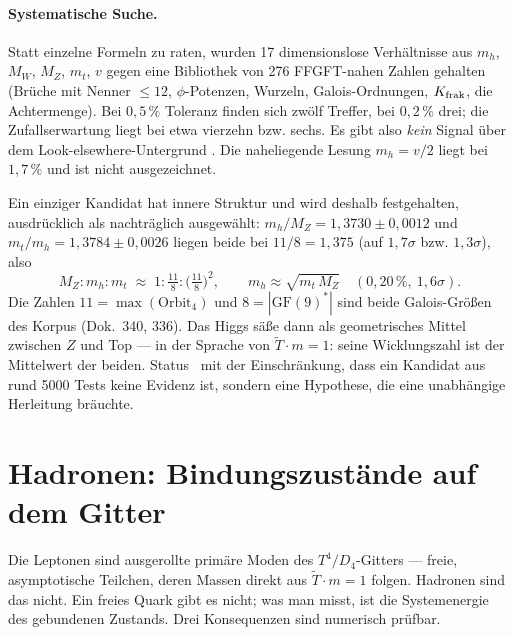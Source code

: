 \paragraph{Systematische Suche.}
Statt einzelne Formeln zu raten, wurden 17 dimensionslose Verhältnisse aus
$m_h$, $M_W$, $M_Z$, $m_t$, $v$ gegen eine Bibliothek von 276 FFGFT-nahen
Zahlen gehalten (Brüche mit Nenner $\le 12$, $\phi$-Potenzen, Wurzeln,
Galois-Ordnungen, $K_{\rm frak}$, die Achtermenge). Bei $0{,}5\,\%$
Toleranz finden sich zwölf Treffer, bei $0{,}2\,\%$ drei; die
Zufallserwartung liegt bei etwa vierzehn bzw. sechs. Es gibt also
\emph{kein} Signal über dem Look-elsewhere-Untergrund \XM. Die naheliegende
Lesung $m_h = v/2$ liegt bei $1{,}7\,\%$ und ist nicht ausgezeichnet.

Ein einziger Kandidat hat innere Struktur und wird deshalb festgehalten,
ausdrücklich als nachträglich ausgewählt: $m_h/M_Z = 1{,}3730 \pm 0{,}0012$
und $m_t/m_h = 1{,}3784 \pm 0{,}0026$ liegen beide bei $11/8 = 1{,}375$
(auf $1{,}7\sigma$ bzw. $1{,}3\sigma$), also
\[
  M_Z : m_h : m_t \;\approx\; 1 : \tfrac{11}{8} : \bigl(\tfrac{11}{8}\bigr)^2,
  \qquad m_h \approx \sqrt{m_t\,M_Z} \quad (0{,}20\,\%,\ 1{,}6\sigma).
\]
Die Zahlen $11 = \max(\text{Orbit}_4)$ und $8 = |\mathrm{GF}(9)^*|$ sind beide
Galois-Größen des Korpus (Dok.~340, 336). Das Higgs säße dann als
geometrisches Mittel zwischen $Z$ und Top --- in der Sprache von
$\tilde T\cdot m = 1$: seine Wicklungszahl ist der Mittelwert der beiden.
Status \SM~mit der Einschränkung, dass ein Kandidat aus rund 5000 Tests
keine Evidenz ist, sondern eine Hypothese, die eine unabhängige Herleitung
bräuchte.


\section{Hadronen: Bindungszustände auf dem Gitter}
\label{sec:hadronen}

Die Leptonen sind ausgerollte primäre Moden des $T^4/D_4$-Gitters --- freie,
asymptotische Teilchen, deren Massen direkt aus $\tilde T\cdot m = 1$ folgen.
Hadronen sind das nicht. Ein freies Quark gibt es nicht; was man misst, ist
die Systemenergie des gebundenen Zustands. Drei Konsequenzen sind numerisch prüfbar.

